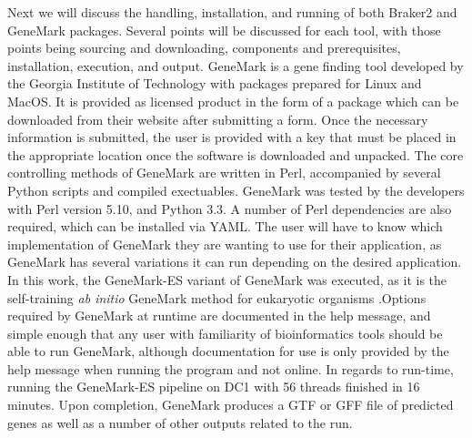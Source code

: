 Next we will discuss the handling, installation, and running of both
Braker2 and GeneMark packages. Several points will be discussed for
each tool, with those points being sourcing and downloading,
components and prerequisites, installation, execution, and
output. GeneMark\cite{10.1093/nar/gki937} is a gene finding tool
developed by the Georgia Institute of Technology with packages
prepared for Linux and MacOS. It is provided as licensed product in
the form of a package which can be downloaded from their website after
submitting a form. Once the necessary information is submitted, the
user is provided with a key that must be placed in the appropriate
location once the software is downloaded and unpacked. The core
controlling methods of GeneMark are written in Perl, accompanied by
several Python scripts and compiled exectuables. GeneMark was tested
by the developers with Perl version 5.10, and Python 3.3. A number of
Perl dependencies are also required, which can be installed via
YAML. The user will have to know which implementation of GeneMark they
are wanting to use for their application, as GeneMark has several
variations it can run depending on the desired application. In this
work, the GeneMark-ES variant of GeneMark was executed, as it is the
self-training \textit{ab initio} GeneMark method for eukaryotic
organisms .Options required by GeneMark at runtime are documented in
the help message, and simple enough that any user with familiarity of
bioinformatics tools should be able to run GeneMark, although
documentation for use is only provided by the help message when
running the program and not online. In regards to run-time, running
the GeneMark-ES pipeline on DC1 with 56 threads finished in 16
minutes. Upon completion, GeneMark produces a GTF or GFF file of
predicted genes as well as a number of other outputs related to the
run.

